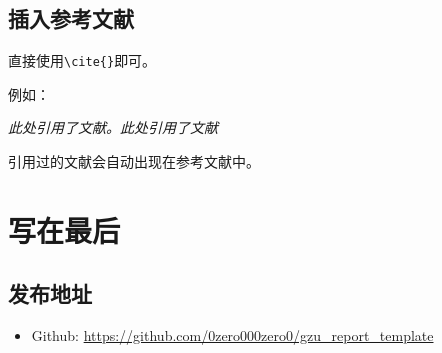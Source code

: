 \documentclass[12pt,hyperref,a4paper,UTF8]{ctexart}
\begin{document}
%
%
%
%
%
%

\subsection{插入参考文献}
直接使用\verb|\cite{}|即可。

例如：


\textit{ 此处引用了文献\cite{0Isaac}。此处引用了文献\cite{2016The}}


引用过的文献会自动出现在参考文献中。

\section{写在最后}
\subsection{发布地址}
\begin{itemize}
    \item Github: \url{https://github.com/0zero000zero0/gzu_report_template}

\end{itemize}


\end{document}
